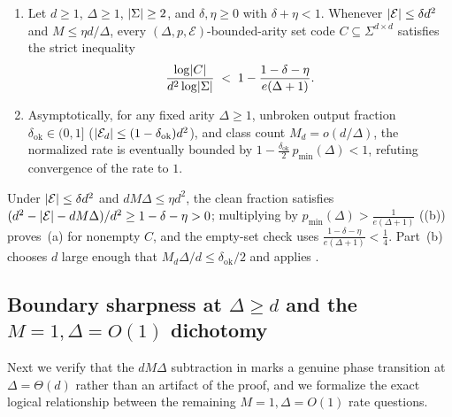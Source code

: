 \begin{theorem}\label{thm:growing-deficit}
\begin{enumerate}[label=(\alph*)]
\item Let $d \ge 1$, $\Delta \ge 1$, $\lvert \Sigma \rvert \ge 2$, and $\delta, \eta \ge 0$ with
  $\delta + \eta < 1$. Whenever $\lvert \mathcal{E} \rvert \le \delta d^2$ and $M \le \eta d/\Delta$, every
  $(\Delta, p, \mathcal{E})$-bounded-arity set code $C \subseteq \Sigma^{d\times d}$ satisfies the
  strict inequality
  \[
    \frac{\log\lvert C \rvert}{d^2\log\lvert \Sigma \rvert}
    \;<\; 1 - \frac{1 - \delta - \eta}{e(\Delta+1)}.
  \]
\item Asymptotically, for any fixed arity $\Delta \ge 1$, unbroken output fraction
  $\delta_{\mathrm{ok}} \in (0,1]$ ($\lvert \mathcal{E}_d \rvert \le (1 - \delta_{\mathrm{ok}})d^2$), and
  class count $M_d = o(d/\Delta)$, the normalized rate is eventually bounded by
  $1 - \frac{\delta_{\mathrm{ok}}}{2}\,p_{\min}(\Delta) < 1$, refuting convergence of the rate to $1$.
\end{enumerate}
\end{theorem}
\begin{outline}
Under $\lvert \mathcal{E} \rvert \le \delta d^2$ and $d M \Delta \le \eta d^2$, the clean fraction satisfies
$(d^2 - \lvert \mathcal{E} \rvert - dM\Delta)/d^2 \ge 1 - \delta - \eta > 0$; multiplying by
$p_{\min}(\Delta) > \frac{1}{e(\Delta+1)}$ ((b)) proves~(a) for nonempty $C$,
and the empty-set check uses $\frac{1-\delta-\eta}{e(\Delta+1)} < \frac{1}{4}$. Part~(b) chooses
$d$ large enough that $M_d \Delta / d \le \delta_{\mathrm{ok}}/2$ and applies .
\end{outline}

\subsection{Boundary sharpness at \texorpdfstring{$\Delta \ge d$}{Delta >= d} and the \texorpdfstring{$M=1, \Delta=O(1)$}{M=1, Delta=O(1)} dichotomy}\label{sec:capacity-boundary}

Next we verify that the $d M \Delta$ subtraction in  marks a genuine phase
transition at $\Delta = \Theta(d)$ rather than an artifact of the proof, and we formalize the exact
logical relationship between the remaining $M = 1, \Delta = O(1)$ rate questions.

